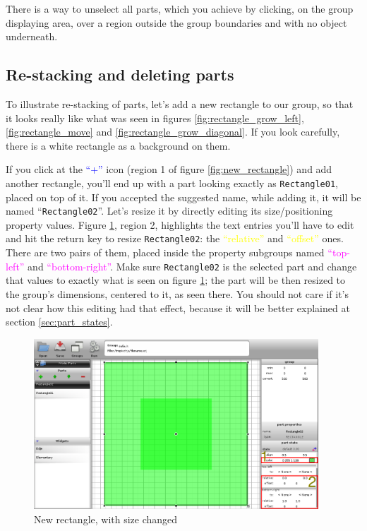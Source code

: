 \documentclass[a4paper]{profusion}
\newcommand{\GUIIcon}[1]{\textcolor{blue}{#1}}    %
\newcommand{\GUILabel}[1]{\textcolor{magenta}{#1}}
\newcommand{\GUIEditable}[1]{\textcolor{yellow}{#1}} %
\begin{document}
There is a way to unselect all parts, which you achieve by clicking,
on the group displaying area, over a region outside the group
boundaries and with no object underneath.

\subsection{Re-stacking and deleting parts}

To illustrate re-stacking of parts, let's add a new rectangle to our
group, so that it looks really like what was seen in figures
\ref{fig:rectangle_grow_left}, \ref{fig:rectangle_move} and
\ref{fig:rectangle_grow_diagonal}. If you look carefully, there is a
white rectangle as a background on them.

If you click at the \GUIIcon{``+''} icon (region 1 of figure
\ref{fig:new_rectangle}) and add another rectangle, you'll end up with
a part looking exactly as \texttt{Rectangle01}, placed on top of
it. If you accepted the suggested name, while adding it, it will be
named ``\texttt{Rectangle02}''. Let's resize it by directly editing
its size/positioning property values. Figure
\ref{fig:restack_pre_pre}, region 2, highlights the text entries
you'll have to edit and hit the return key to resize
\texttt{Rectangle02}: the \GUIEditable{``relative''} and
\GUIEditable{``offset''} ones. There are two pairs of them, placed
inside the property subgroups named \GUILabel{``top-left''} and
\GUILabel{``bottom-right''}. Make sure \texttt{Rectangle02} is the
selected part and change that values to exactly what is seen on figure
\ref{fig:restack_pre_pre}; the part will be then resized to the
group's dimensions, centered to it, as seen there. You should not care
if it's not clear how this editing had that effect, because it will be
better explained at section \ref{sec:part_states}.

\begin{figure}[h!]
  \centering
  \includegraphics[width=0.95\textwidth]{images/part_resize_entries.png}
  \caption{New rectangle, with size changed}
  \label{fig:restack_pre_pre}
\end{figure}
\end{document}

